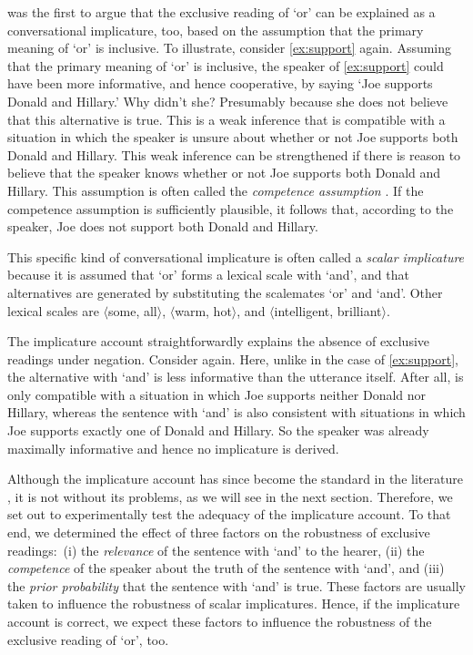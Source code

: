 \documentclass[12pt]{article}
\begin{document}
\citet{horn1972} was the first to argue that the exclusive reading of `or' can be explained as
a conversational implicature, too, based on the assumption that the primary meaning of `or' is
inclusive. To illustrate, consider \ref{ex:support} again. Assuming that the primary meaning of
`or' is inclusive, the speaker of \ref{ex:support} could have been more informative, and hence
cooperative, by saying `Joe supports Donald and Hillary.' Why didn't she? Presumably because
she does not believe that this alternative is true. This is a weak inference that is compatible
with a situation in which the speaker is unsure about whether or not Joe supports both Donald
and Hillary. This weak inference can be strengthened if there is reason to believe that the speaker knows whether or not Joe supports both Donald and Hillary. This assumption is often called the \emph{competence assumption} \citep[e.g.,][]{ZimmermannFreeChoiceDisjunction2000,vanRooijSchulz:ExhaustiveInterpretation,Russell2006:Against-Grammat,geurts2010}. If the competence assumption is sufficiently plausible, it follows that, according to the speaker, Joe does not support both Donald and Hillary.

This specific kind of conversational implicature is often called a \emph{scalar implicature} because it is assumed that `or' forms a lexical scale with `and', and that alternatives are generated by substituting the scalemates `or' and `and'. Other lexical scales are $\langle$some, all$\rangle$, $\langle$warm, hot$\rangle$, and $\langle$intelligent, brilliant$\rangle$.

The implicature account straightforwardly explains the absence of exclusive readings under negation. Consider \LLast again. Here, unlike in the case of \ref{ex:support}, the alternative with `and' is less informative than the utterance itself. After all, \LLast is only compatible with a situation in which Joe supports neither Donald nor Hillary, whereas the sentence with `and' is also consistent with situations in which Joe supports exactly one of Donald and Hillary. So the speaker was already maximally informative and hence no implicature is derived.

Although the implicature account has since become the standard in the literature \citep[e.g.,][]{chevallier2008, chierchia2012, fox2007, sauerland2004, geurts2010}, it is not without its problems, as we will see in the next section. Therefore, we set out to experimentally test the adequacy of the implicature account. To that end, we determined the effect of three factors on the robustness of exclusive readings:\ (i) the \emph{relevance} of the sentence with `and' to the hearer, (ii) the \emph{competence} of the speaker about the truth of the sentence with `and', and (iii) the \emph{prior probability} that the sentence with `and' is true. These factors are usually taken to influence the robustness of scalar implicatures. Hence, if the implicature account is correct, we expect these factors to influence the robustness of the exclusive reading of `or', too. 
\end{document}

